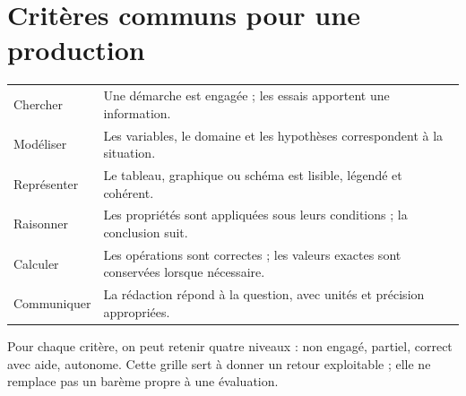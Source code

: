 \section*{Critères communs pour une production}
\begin{center}\small{}\begin{tabularx}{\linewidth}{l X}
Chercher&Une démarche est engagée ; les essais apportent une information.\\
Modéliser&Les variables, le domaine et les hypothèses correspondent à la situation.\\
Représenter&Le tableau, graphique ou schéma est lisible, légendé et cohérent.\\
Raisonner&Les propriétés sont appliquées sous leurs conditions ; la conclusion suit.\\
Calculer&Les opérations sont correctes ; les valeurs exactes sont conservées lorsque nécessaire.\\
Communiquer&La rédaction répond à la question, avec unités et précision appropriées.
\end{tabularx}\end{center}
Pour chaque critère, on peut retenir quatre niveaux : non engagé, partiel, correct avec aide, autonome. Cette grille sert à donner un retour exploitable ; elle ne remplace pas un barème propre à une évaluation.

